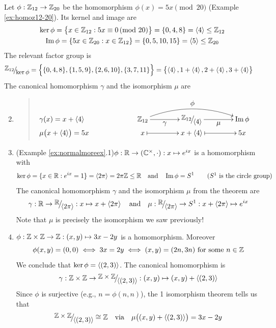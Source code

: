 \begin{examples}{}{}
	\exstart Let $\phi:\mathbb{Z}_{12}\to\mathbb{Z}_{20}$ be the homomorphism $\phi(x)=5x\!\!\pmod{20}$ (Example \ref{ex:homoz12-20}). Its kernel and image are
	\begin{gather*}
		\ker\phi
		=\bigl\{x\in\mathbb{Z}_{12}:5x\equiv 0\negthickspace\pmod{20}\bigr\}
		=\{0,4,8\}
		=\left\langle 4\right\rangle\le \mathbb{Z}_{12}\\
		\operatorname{Im}\phi=\{5x\in\mathbb{Z}_{20}:x\in\mathbb{Z}_{12}\}
		=\{0,5,10,15\}
		=\left\langle 5\right\rangle\le\mathbb{Z}_{20}
	\end{gather*}
	The relevant factor group is
	\begin{align*}
		\quotient{\Z_{12}}{\ker\phi}
		&=\Bigl\{\{0,4,8\},\{1,5,9\},\{2,6,10\},\{3,7,11\}\Bigr\}
		=\bigl\{\ip 4,1+\ip 4,2+\ip 4,3+\ip 4\bigr\}
	\end{align*}
	The canonical homomorphism $\gamma$ and the isomorphism $\mu$ are\vspace{-5pt}
	\begin{enumerate}\setcounter{enumi}{1}
	  \item[]\begin{quote}
			$\SelectTips{cm}{}\xymatrix @C40pt @R0pt{%
				\rlap{$\gamma(x)=x+\ip 4$} &&& \Z_{12} \ar@{->}[r]_-{\textstyle\gamma} \ar@{->}@/^15pt/[rr]^{\textstyle\phi} & \quotient{\Z_{12}}{\ip 4} \ar@{->}[r]_-{\textstyle\mu} & \image\phi\\
				\rlap{$\mu\bigl(x+\ip 4\bigr)=5x$} &&& x \ar@{|->}[r] & x+\ip 4 \ar@{|->}[r] & 5x
			}$
		\end{quote}
	  
	\item (Example \ref{ex:normalmoreex}.1)\lstsp $\phi:\mathbb{R}\to(\mathbb{C}^\times,\cdot):x\mapsto e^{ix}$ is a homomorphism with
  \[
  	\ker\phi=\{x\in\mathbb{R}:e^{ix}=1\}=\left\langle 2\pi\right\rangle=2\pi\mathbb{Z}\le\mathbb{R}
  	\quad\text{and}\quad 
  	\operatorname{Im}\phi=S^1
  	\tag{$S^1$ is the circle group}
  \]
  The canonical homomorphism $\gamma$ and the isomorphism $\mu$ from the theorem are
  \[
  	\gamma:\R\to\quotient{\R}{\ip{2\pi}}:x\mapsto x+\ip{2\pi}
  	\quad\text{and}\quad
  	\mu:\quotient\R{\ip{2\pi}}\to S^1:x+\ip{2\pi}\mapsto e^{ix}
  \]
  Note that $\mu$ is precisely the isomorphism we saw previously!
  
  \item $\phi:\mathbb{Z}\times\mathbb{Z}\to\mathbb{Z}:(x,y)\mapsto 3x-2y$ is a homomorphism. Moreover
  \[
  	\phi(x,y)=(0,0)\iff 3x=2y\iff (x,y)=(2n,3n)\text{ for some $n\in\mathbb{Z}$}
  \]
  We conclude that $\ker\phi=\left\langle (2,3)\right\rangle$. The canonical homomorphism is
  \[
  	\gamma:\Z\times\Z\to
  	\quotient{\Z\times\Z}{\ip{(2,3)}}:
  	(x,y)\mapsto (x,y)+\ip{(2,3)}
  \]
  Since $\phi$ is surjective (e.g., $n=\phi(n,n)$), the 1\st{} isomorphism theorem tells us that
  \[
  	\quotient{\Z\times\Z}{\ip{(2,3)}}\cong\Z
  	\quad\text{via}\quad 
  	\mu\bigl((x,y)+\ip{(2,3)}\bigr)=3x-2y
  \]
  

\end{enumerate}
\end{examples}
